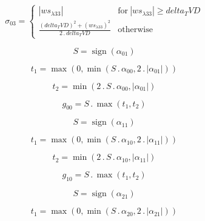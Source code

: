 \documentclass{article}
\begin{document}
\begin{dmath}\sigma_{0 3} = \begin{cases} \left|{ws_{\lambda 33}}\right| & \text{for}\: \left|{ws_{\lambda 33}}\right| \geq delta_TVD \\\frac{\left(delta_TVD \right)^{2} + \left(ws_{\lambda 33} \right)^{2}}{2 \,.\, delta_TVD} & \text{otherwise} 
\end{cases}\end{dmath}

\begin{dmath}S = \operatorname{sign}{\left (\alpha_{01} \right )}\end{dmath}

\begin{dmath}t_{1} = \max\left(0, \min\left(S \,.\, \alpha_{00}, 2 \,.\, \left|{\alpha_{01}}\right|\right)\right)\end{dmath}

\begin{dmath}t_{2} = \min\left(2 \,.\, S \,.\, \alpha_{00}, \left|{\alpha_{01}}\right|\right)\end{dmath}

\begin{dmath}g_{00} = S \,.\, \max\left(t_{1}, t_{2}\right)\end{dmath}

\begin{dmath}S = \operatorname{sign}{\left (\alpha_{11} \right )}\end{dmath}

\begin{dmath}t_{1} = \max\left(0, \min\left(S \,.\, \alpha_{10}, 2 \,.\, \left|{\alpha_{11}}\right|\right)\right)\end{dmath}

\begin{dmath}t_{2} = \min\left(2 \,.\, S \,.\, \alpha_{10}, \left|{\alpha_{11}}\right|\right)\end{dmath}

\begin{dmath}g_{10} = S \,.\, \max\left(t_{1}, t_{2}\right)\end{dmath}

\begin{dmath}S = \operatorname{sign}{\left (\alpha_{21} \right )}\end{dmath}

\begin{dmath}t_{1} = \max\left(0, \min\left(S \,.\, \alpha_{20}, 2 \,.\, \left|{\alpha_{21}}\right|\right)\right)\end{dmath}
\end{document}
